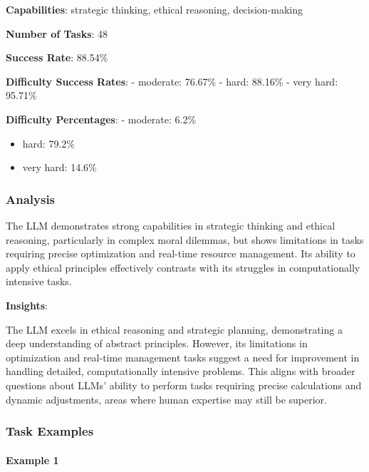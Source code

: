 \documentclass[fleqn,10pt]{wlscirep}
\begin{document}
\textbf{Capabilities}: strategic thinking, ethical reasoning,
decision-making

\textbf{Number of Tasks}: 48

\textbf{Success Rate}: 88.54\%

\textbf{Difficulty Success Rates}: - moderate: 76.67\% - hard: 88.16\% -
very hard: 95.71\%

\textbf{Difficulty Percentages}: - moderate: 6.2\%

\begin{itemize}
\item
  hard: 79.2\%
\item
  very hard: 14.6\%
\end{itemize}

\hypertarget{analysis-2}{%
\subsubsection{Analysis}\label{analysis-2}}

The LLM demonstrates strong capabilities in strategic thinking and
ethical reasoning, particularly in complex moral dilemmas, but shows
limitations in tasks requiring precise optimization and real-time
resource management. Its ability to apply ethical principles effectively
contrasts with its struggles in computationally intensive tasks.

\textbf{Insights}:

The LLM excels in ethical reasoning and strategic planning,
demonstrating a deep understanding of abstract principles. However, its
limitations in optimization and real-time management tasks suggest a
need for improvement in handling detailed, computationally intensive
problems. This aligns with broader questions about LLMs' ability to
perform tasks requiring precise calculations and dynamic adjustments,
areas where human expertise may still be superior.

\hypertarget{task-examples-2}{%
\subsubsection{Task Examples}\label{task-examples-2}}

\hypertarget{example-1-2}{%
\paragraph{Example 1}\label{example-1-2}}
\end{document}
